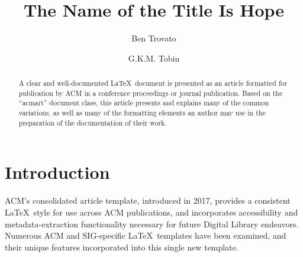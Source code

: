 \documentclass[acmsmall]{acmart}
\begin{document}
\title{The Name of the Title Is Hope}

\author{Ben Trovato}
\author{G.K.M. Tobin}
\correspondingauthor
\authornotemark[1]


\begin{abstract}
  A clear and well-documented \LaTeX\ document is presented as an
  article formatted for publication by ACM in a conference proceedings
  or journal publication. Based on the ``acmart'' document class, this
  article presents and explains many of the common variations, as well
  as many of the formatting elements an author may use in the
  preparation of the documentation of their work.
\end{abstract}



\maketitle


\section{Introduction}
ACM's consolidated article template, introduced in 2017, provides a
consistent \LaTeX\ style for use across ACM publications, and
incorporates accessibility and metadata-extraction functionality
necessary for future Digital Library endeavors. Numerous ACM and
SIG-specific \LaTeX\ templates have been examined, and their unique
features incorporated into this single new template.
\end{document}
